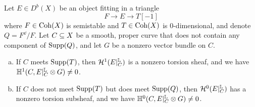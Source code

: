 \begin{lem}\label{supportintersection}
Let $E \in D^b(X)$ be an object fitting in a triangle
\[ F \to E \to T[-1] \]
where $F \in \operatorname{\mathrm{Coh}}(X)$ is semistable and $T \in \operatorname{\mathrm{Coh}}(X)$ is 0-dimensional, and denote $Q = F^\dd/F$. Let $C \subseteq X$ be a smooth, proper curve that does not contain any component of $\operatorname{\mathrm{Supp}}(Q)$, and let $G$ be a nonzero vector bundle on $C$.
\begin{enumerate}[(a)]
    \item If $C$ meets $\operatorname{\mathrm{Supp}}(T)$, then $\mathcal{H}^1(E|^{\mathbb{L}}_C)$ is a nonzero torsion sheaf, and we have $\mathbb{H}^1(C, E|^{\mathbb{L}}_C \otimes G) \neq 0$.
    \item If $C$ does not meet $\operatorname{\mathrm{Supp}}(T)$ but does meet $\operatorname{\mathrm{Supp}}(Q)$, then $\mathcal{H}^0(E|^{\mathbb{L}}_C)$ has a nonzero torsion subsheaf, and we have $\mathbb{H}^0(C, E|^{\mathbb{L}}_C \otimes G) \neq 0$.
\end{enumerate}
\end{lem}
